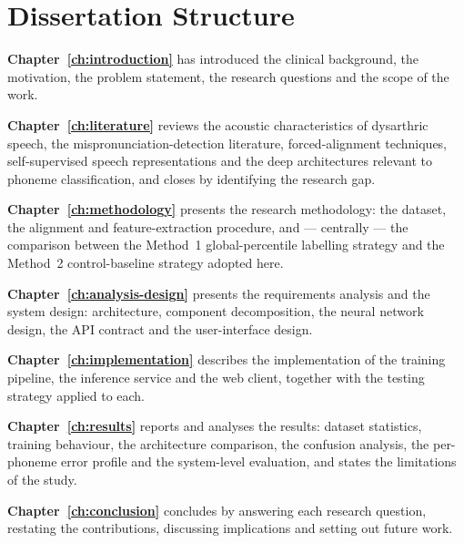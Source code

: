 \section{Dissertation Structure}
\label{sec:structure}

\textbf{Chapter~\ref{ch:introduction}} has introduced the clinical background,
the motivation, the problem statement, the research questions and the scope of
the work.

\textbf{Chapter~\ref{ch:literature}} reviews the acoustic characteristics of
dysarthric speech, the mispronunciation-detection literature, forced-alignment
techniques, self-supervised speech representations and the deep architectures
relevant to phoneme classification, and closes by identifying the research gap.

\textbf{Chapter~\ref{ch:methodology}} presents the research methodology: the
dataset, the alignment and feature-extraction procedure, and --- centrally ---
the comparison between the Method~1 global-percentile labelling strategy and
the Method~2 control-baseline strategy adopted here.

\textbf{Chapter~\ref{ch:analysis-design}} presents the requirements analysis and
the system design: architecture, component decomposition, the neural network
design, the API contract and the user-interface design.

\textbf{Chapter~\ref{ch:implementation}} describes the implementation of the
training pipeline, the inference service and the web client, together with the
testing strategy applied to each.

\textbf{Chapter~\ref{ch:results}} reports and analyses the results: dataset
statistics, training behaviour, the architecture comparison, the confusion
analysis, the per-phoneme error profile and the system-level evaluation, and
states the limitations of the study.

\textbf{Chapter~\ref{ch:conclusion}} concludes by answering each research
question, restating the contributions, discussing implications and setting out
future work.
